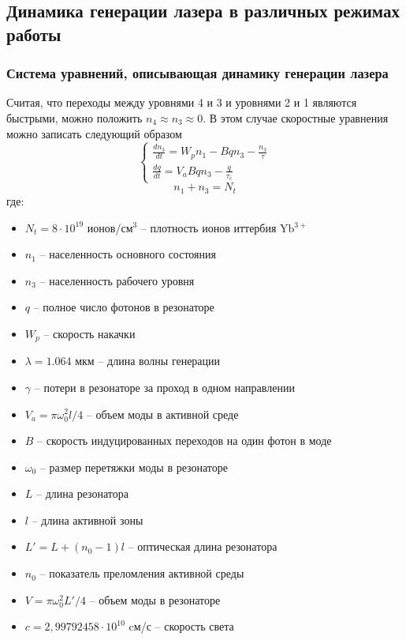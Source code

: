 \documentclass[a4paper, 12pt]{article}
\begin{document}
	\subsection{Динамика генерации лазера в различных режимах работы}
	\subsubsection{Система уравнений, описывающая динамику генерации лазера}
	Считая, что переходы между уровнями 4 и 3 и уровнями 2 и 1 являются быстрыми, можно положить $n_4\approx n_3\approx 0$. В этом случае скоростные уравнения можно записать следующий образом
	\begin{equation}
		\begin{cases}
			\frac{dn_3}{dt}=W_pn_1-Bqn_3-\frac{n_3}{\tau}\\
			\frac{dq}{dt}=V_aBqn_3-\frac{q}{\tau_c}
		\end{cases}
		\label{eq5.1}
	\end{equation}
	\begin{equation*}
		n_1+n_3=N_t
	\end{equation*}
	где:
	\begin{itemize}[noitemsep]
		\item $N_t=8\cdot10^{19}$ ионов/см$^3$ -- плотность ионов иттербия Yb$^{3+}$
		\item $n_1$ -- населенность основного состояния
		\item $n_3$ -- населенность рабочего уровня
		\item $q$ -- полное число фотонов в резонаторе
		\item $W_p$ -- скорость накачки
		\item $\lambda=1.064$ мкм -- длина волны генерации
		\item $\gamma$ -- потери в резонаторе за проход в одном направлении
		\item $V_a=\pi\omega_0^2 l/4$ -- объем моды в активной среде
		\item $B$ -- скорость индуцированных переходов на один фотон в моде
		\item $\omega_0$ -- размер перетяжки моды в резонаторе
		\item $L$ -- длина резонатора
		\item $l$ -- длина активной зоны
		\item $L'=L+\left(n_0-1\right)l$ -- оптическая длина резонатора
		\item $n_0$ -- показатель преломления активной среды
		\item $V=\pi\omega_0^2L'/4$ -- объем моды в резонаторе
		\item $c=2,99792458\cdot 10^{10}$ cм/с -- скорость света
	\end{itemize}
\end{document}
